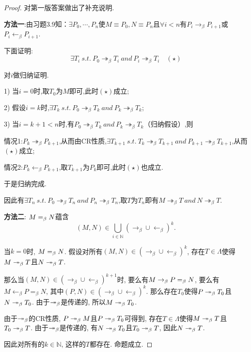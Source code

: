\begin{proof}{\color {red} {对第一版答案做出了补充说明.}}

    \textbf{方法一}:由习题3.9知：$\exists P_0, \cdots , P_n$使$M \equiv P_0, N \equiv P_n$且$\forall i < n$有$P_i \rightarrow_{\beta} P_{i+1}$或$P_i \leftarrow_{\beta} P_{i+1}$.
    
    下面证明:
    $$\exists T_i \  s.t. \  P_0 \twoheadrightarrow_{\beta} T_i \ and \  P_i \twoheadrightarrow_{\beta} T_i \quad(\star)$$
    
    对$i$做归纳证明.
    
    1) 当$i=0$时,取$T_0$为$M$即可,此时$(\star)$成立;
    
    2) 假设$i=k$时,$\exists T_k \  s.t. \  P_0 \twoheadrightarrow_{\beta} T_k \ and \  P_k \twoheadrightarrow_{\beta} T_k $;
    
    3) 当$i=k+1<n$时,有$P_0 \twoheadrightarrow_{\beta} T_k \ and \  P_k \twoheadrightarrow_{\beta} T_k$（归纳假设）,则
    
        情况1:$P_k \twoheadrightarrow_{\beta} P_{k+1}$,从而由CR性质,$\exists T_{k+1} \ s.t. \  T_k \twoheadrightarrow_{\beta} T_{k+1} \ and \ P_{k+1} \twoheadrightarrow_{\beta} T_{k+1}$,从而$(\star)$成立;
    
        情况2:$P_k \leftarrow_{\beta} P_{k+1}$,取$T_{k+1}$为$P_k$即可,此时$(\star)$也成立.
    
    于是归纳完成.
    
    因此有$\exists T_n \  s.t. \  P_0 \twoheadrightarrow_{\beta} T_n \ and \  P_n \twoheadrightarrow_{\beta} T_n $,取$T$为$T_n$即有$M\twoheadrightarrow_{\beta} T \ and \ N \twoheadrightarrow_{\beta} T$.
    
    \hspace*{\fill}
    
    \textbf{方法二}:
    $M=_{\beta} N$蕴含
	$$(M,N)\in\bigcup_{i\in\mathbb{N}}(\to_{\beta}\cup\leftarrow_{\beta})^k.$$
	
	当$k=0$时, $M=_{\beta} N$.
	假设对所有$(M,N)\in(\to_{\beta}\cup\leftarrow_{\beta})^k$, 存在$T\in\Lambda$使得$M\twoheadrightarrow_{\beta} T$且$N\twoheadrightarrow_{\beta} T$.
	
	那么当$(M,N)\in(\to_{\beta}\cup\leftarrow_{\beta})^{k+1}$时, 要么有$M\rightarrow_{\beta} P=_\beta N$, 要么有$M\leftarrow_\beta P=_\beta N$, 其中$(P,N)\in(\to_{\beta}\cup\leftarrow_{\beta})^k$. 那么存在$T_0$使得$P\twoheadrightarrow_{\beta} T_0$且$N\twoheadrightarrow_{\beta} T_0$. 由于$\twoheadrightarrow_{\beta}$是传递的, 所以$M\twoheadrightarrow_{\beta} T_0$.
	
	由于$\twoheadrightarrow_{\beta}$的CR性质, $P\twoheadrightarrow_{\beta} M$且$P\twoheadrightarrow_{\beta} T_0$可得到, 存在$T\in\Lambda$使得$M\twoheadrightarrow_{\beta} T$且$T_0\twoheadrightarrow_{\beta} T$. 由于$\twoheadrightarrow_{\beta}$是传递的, 有$N\twoheadrightarrow_{\beta} T_0$且$T_0\twoheadrightarrow_{\beta} T$, 因此$N\twoheadrightarrow_{\beta} T$.
	
	因此对所有的$k\in\mathbb{N}$, 这样的$T$都存在. 命题成立.
\end{proof}